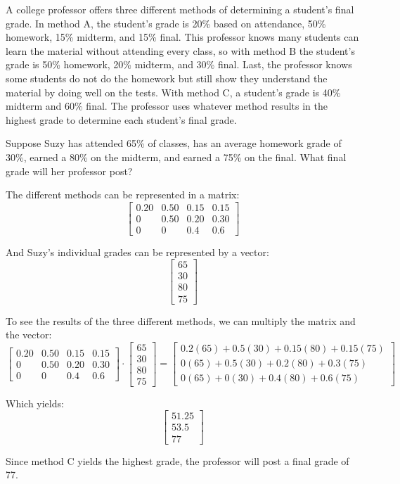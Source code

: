 \begin{Exercise}[title = {Using Vector Matrix Multiplication}, label = vmm02]
A college professor offers three different methods of determining a student's final grade. In method A, the student's grade is 20\% based on attendance, 50\% homework, 15\% midterm, and 15\% final. This professor knows many students can learn the material without attending every class, so with method B the student's grade is 50\% homework, 20\% midterm, and 30\% final. Last, the professor knows some students do not do the homework but still show they understand the material by doing well on the tests. With method C, a student's grade is 40\% midterm and 60\% final. The professor uses whatever method results in the highest grade to determine each student's final grade. 

Suppose Suzy has attended 65\% of classes, has an average homework grade of 30\%, earned a 80\% on the midterm, and earned a 75\% on the final. What final grade will her professor post?
\end{Exercise}

\begin{Answer}[ref = vmm02]
The different methods can be represented in a matrix:
$$\begin{bmatrix}
0.20 & 0.50 & 0.15 & 0.15\\
0 & 0.50 & 0.20 & 0.30\\
0 & 0 & 0.4 & 0.6
\end{bmatrix}$$

And Suzy's individual grades can be represented by a vector:
$$\begin{bmatrix}
65\\
30\\
80\\
75
\end{bmatrix}
$$

To see the results of the three different methods, we can multiply the matrix and the vector:
$$\begin{bmatrix}
0.20 & 0.50 & 0.15 & 0.15\\
0 & 0.50 & 0.20 & 0.30\\
0 & 0 & 0.4 & 0.6
\end{bmatrix}
\cdot 
\begin{bmatrix}
65\\
30\\
80\\
75
\end{bmatrix} = 
\begin{bmatrix}
0.2(65)+0.5(30)+0.15(80) + 0.15(75)\\
0(65) + 0.5(30) + 0.2(80) + 0.3(75)\\
0(65) + 0(30) + 0.4(80) + 0.6(75)
\end{bmatrix}$$

Which yields:
$$\begin{bmatrix}
51.25\\
53.5\\
77
\end{bmatrix}$$

Since method C yields the highest grade, the professor will post a final grade of 77. 
\end{Answer}

